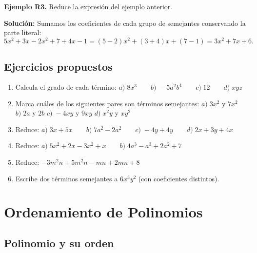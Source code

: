 \documentclass[12pt, letterpaper]{article}
\begin{document}
\textbf{Ejemplo R3.} Reduce la expresión del ejemplo anterior.

\begin{cuadrosolucion}
  \textbf{Solución:} Sumamos los coeficientes de cada grupo de semejantes conservando la parte literal:
  $$5x^2 + 3x - 2x^2 + 7 + 4x - 1 = (5 - 2)x^2 + (3 + 4)x + (7 - 1) = 3x^2 + 7x + 6.$$
\end{cuadrosolucion}


\subsection{Ejercicios propuestos}

\begin{enumerate}[leftmargin=*, resume]
  \item \facil{} Calcula el grado de cada término: $a) \; 8x^3 \qquad b) \; -5a^2b^4 \qquad c) \; 12 \qquad d) \; xyz$

  \item \facil{} Marca cuáles de los siguientes pares son términos semejantes: $a) \; 3x^2$ y $7x^2$ \quad $b) \; 2a$ y $2b$ \quad $c) \; -4xy$ y $9xy$ \quad $d) \; x^2y$ y $xy^2$

  \item \facil{} Reduce: $a) \; 3x + 5x \qquad b) \; 7a^2 - 2a^2 \qquad c) \; -4y + 4y \qquad d) \; 2x + 3y + 4x$

  \item \medio{} Reduce: $a) \; 5x^2 + 2x - 3x^2 + x \qquad b) \; 4a^3 - a^3 + 2a^2 + 7$

  \item \medio{} Reduce: $-3m^2n + 5m^2n - mn + 2mn + 8$

  \item \medio{} Escribe dos términos semejantes a $6x^3y^2$ (con coeficientes distintos).
\end{enumerate}


\section{Ordenamiento de Polinomios}

\subsection{Polinomio y su orden}
\end{document}

